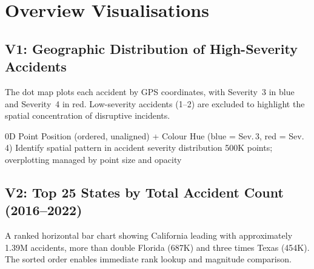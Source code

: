 
\section{Overview Visualisations}

\subsection{V1: Geographic Distribution of High-Severity Accidents}

The dot map plots each accident by GPS coordinates, with Severity~3 in blue and
Severity~4 in red. Low-severity accidents (1--2) are excluded to highlight the
spatial concentration of disruptive incidents.

\begin{figure}[H]
  \centering
  \label{fig:v1}
\end{figure}

\idiomtable
  {0D Point}
  {Position (ordered, unaligned) + Colour Hue (blue = Sev.\,3, red = Sev.\,4)}
  {Identify spatial pattern in accident severity distribution}
  {500K points; overplotting managed by point size and opacity}


\subsection{V2: Top 25 States by Total Accident Count (2016--2022)}

A ranked horizontal bar chart showing California leading with approximately
1.39M accidents, more than double Florida (687K) and three times Texas (454K).
The sorted order enables immediate rank lookup and magnitude comparison.

